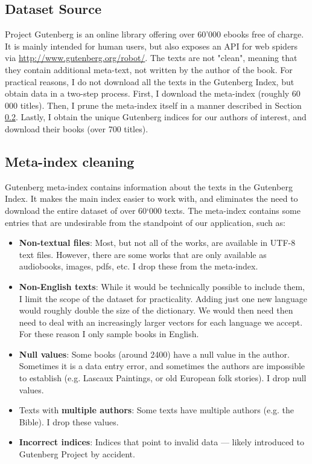 \documentclass[journal,12pt,onecolumn]{IEEEtran}
\begin{document}
\subsection{Dataset Source}

Project Gutenberg is an online library offering over 60'000 ebooks free of charge. It is mainly intended for human users, but also exposes an API for web spiders via \url{http://www.gutenberg.org/robot/}. The texts are not "clean", meaning that they contain additional meta-text, not written by the author of the book. For practical reasons, I do not download all the texts in the Gutenberg Index, but obtain data in a two-step process. First, I download the meta-index (roughly 60 000 titles). Then, I prune the meta-index itself in a manner described in Section \ref{sec:meta}. Lastly, I obtain the unique Gutenberg indices for our authors of interest, and download their books (over 700 titles). 


\subsection{Meta-index cleaning} \label{sec:meta}

Gutenberg meta-index contains information about the texts in the Gutenberg Index. It makes the main index easier to work with, and eliminates the need to download the entire dataset of over 60`000 texts. The meta-index contains some entries that are undesirable from the standpoint of our application, such as:

\begin{itemize}
\item \textbf{Non-textual files}: Most, but not all of the works, are available in UTF-8 text files. However, there are some works that are only available as audiobooks, images, pdfs, etc. I drop these from the meta-index.

\item \textbf{Non-English texts}: While it would be technically possible to include them, I limit the scope of the dataset for practicality. Adding just one new language would roughly double the size of the dictionary. We would then need then need to deal with an increasingly larger vectors for each language we accept. For these reason I only sample books in English.

\item \textbf{Null values}: Some books (around 2400) have a null value in the author. Sometimes it is a data entry error, and sometimes the authors are impossible to establish (e.g. Lascaux Paintings, or old European folk stories). I drop null values.

\item Texts with \textbf{multiple authors}: Some texts have multiple authors (e.g. the Bible). I drop these values. 

\item \textbf{Incorrect indices}: Indices that point to invalid data --- likely introduced to Gutenberg Project by accident.
\end{itemize}
\end{document}
